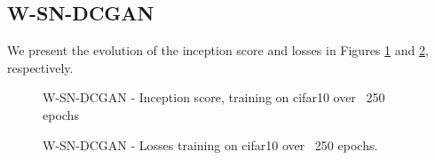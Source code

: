 \subsection{W-SN-DCGAN}
\label{sec:exp-wsndcgan}

We present the evolution of the inception score and losses in Figures \ref{fig:exp-wsndcgan-is} and \ref{fig:exp-wsndcgan-losses}, respectively.
   
\begin{figure}[h]
\centering
\caption{W-SN-DCGAN - Inception score, training on cifar10 over ~250 epochs}
\label{fig:exp-wsndcgan-is}
\end{figure}

\begin{figure}[h]
\centering
\caption{W-SN-DCGAN - Losses training on cifar10 over ~250 epochs.}
\label{fig:exp-wsndcgan-losses}
\end{figure}